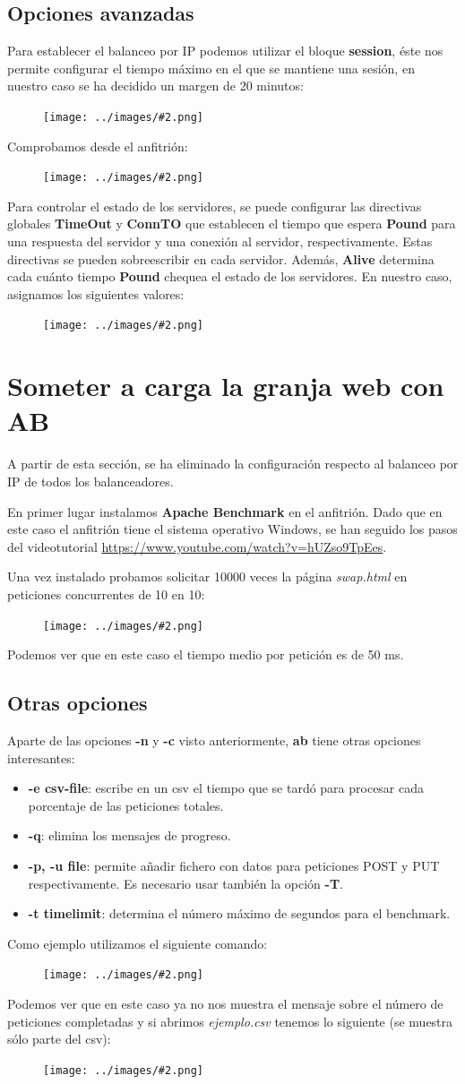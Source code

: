 \documentclass[twoside]{article}
\newcommand{\image}[2]{
\begin{figure}[H]
    \texttt{[image: ../images/\#2.png]}
    \centering
\end{figure}
}
\begin{document}
\subsection{Opciones avanzadas}
Para establecer el balanceo por IP podemos utilizar el bloque \textbf{session}, éste nos permite configurar el tiempo máximo en el que se mantiene una sesión, en nuestro caso se ha decidido un margen de 20 minutos:
\image{8}{45}
Comprobamos desde el anfitrión:
\image{8}{46}
Para controlar el estado de los servidores, se puede configurar las directivas globales \textbf{TimeOut} y \textbf{ConnTO} que establecen el tiempo que espera \textbf{Pound} para una respuesta del servidor y una conexión al servidor, respectivamente. Estas directivas se pueden sobreescribir en cada servidor. Además, \textbf{Alive} determina cada cuánto tiempo \textbf{Pound} chequea el estado de los servidores. En nuestro caso, asignamos los siguientes valores:
\image{6}{47}

\section{Someter a carga la granja web con AB}
A partir de esta sección, se ha eliminado la configuración respecto al balanceo por IP de todos los balanceadores.

En primer lugar instalamos \textbf{Apache Benchmark} en el anfitrión. Dado que en este caso el anfitrión tiene el sistema operativo Windows, se han seguido los pasos del videotutorial \url{https://www.youtube.com/watch?v=hUZso9TpEes}.

Una vez instalado probamos solicitar 10000 veces la página \textit{swap.html} en peticiones concurrentes de 10 en 10:
\image{8}{48}
Podemos ver que en este caso el tiempo medio por petición es de 50 ms.
\subsection{Otras opciones}
Aparte de las opciones \textbf{-n} y \textbf{-c} visto anteriormente, \textbf{ab} tiene otras opciones interesantes:
\begin{itemize}
    \item \textbf{-e csv-file}: escribe en un csv el tiempo que se tardó para procesar cada porcentaje de las peticiones totales.
    \item \textbf{-q}: elimina los mensajes de progreso.
    \item \textbf{-p, -u file}: permite añadir fichero con datos para peticiones POST y PUT respectivamente. Es necesario usar también la opción \textbf{-T}. 
    \item \textbf{-t timelimit}: determina el número máximo de segundos para el benchmark.
\end{itemize}
Como ejemplo utilizamos el siguiente comando:
\image{8}{49}
Podemos ver que en este caso ya no nos muestra el mensaje sobre el número de peticiones completadas y si abrimos \textit{ejemplo.csv} tenemos lo siguiente (se muestra sólo parte del csv):
\image{6}{50}
\end{document}
